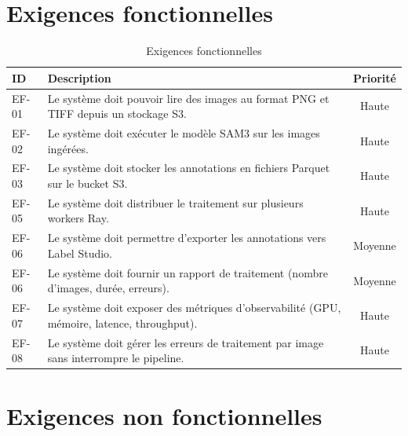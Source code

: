 \section{Exigences fonctionnelles}

\begin{table}[H]
\centering
\begin{tabular}{|l|p{10cm}|c|}
\hline
\textbf{ID} & \textbf{Description} & \textbf{Priorité} \\
\hline
EF-01 & Le système doit pouvoir lire des images au format PNG et TIFF depuis un stockage S3. & Haute \\
\hline
EF-02 & Le système doit exécuter le modèle SAM3 sur les images ingérées. & Haute \\
\hline
EF-03 & Le système doit stocker les annotations en fichiers Parquet sur le bucket S3. & Haute \\
\hline
EF-05 & Le système doit distribuer le traitement sur plusieurs workers Ray. & Haute \\
\hline
EF-06 & Le système doit permettre d'exporter les annotations vers Label Studio. & Moyenne \\
\hline
EF-06 & Le système doit fournir un rapport de traitement (nombre d'images, durée, erreurs). & Moyenne \\
\hline
EF-07 & Le système doit exposer des métriques d'observabilité (GPU, mémoire, latence, throughput). & Haute \\
\hline
EF-08 & Le système doit gérer les erreurs de traitement par image sans interrompre le pipeline. & Haute \\
\hline
\end{tabular}
\caption{Exigences fonctionnelles}
\label{tab:exigences-fonctionnelles}
\end{table}

\section{Exigences non fonctionnelles}

